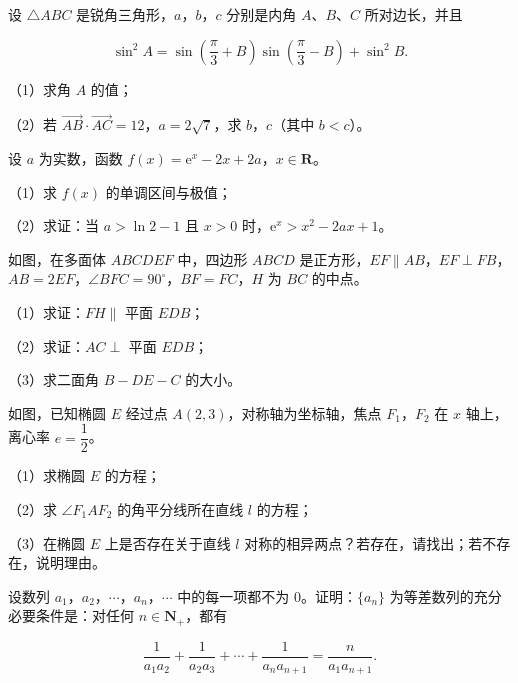 \begin{question}
设 $\triangle ABC$ 是锐角三角形，$a$，$b$，$c$ 分别是内角 $A$、$B$、$C$ 所对边长，并且

\nopagebreak[4]
\[\sin^2A=\sin\left(\frac\pi3+B\right)\sin\left(\frac\pi3-B\right)+\sin^2B.\]

（1）求角 $A$ 的值；

（2）若 $\overrightarrow{AB}\cdot\overrightarrow{AC}=12$，$a=2\sqrt7$，求 $b$，$c$（其中 $b<c$）。

\end{question}
\begin{question}
设 $a$ 为实数，函数 $f(x)=\mathrm e^x-2x+2a$，$x\in\mathbf R$。

（1）求 $f(x)$ 的单调区间与极值；

（2）求证：当 $a>\ln2-1$ 且 $x>0$ 时，$\mathrm e^x>x^2-2ax+1$。

\Needspace{0.4\textheight}
\end{question}
\begingroup
\renewenvironment{question}{\Needspace{0.5\textheight}}{}
\begin{question}
如图，在多面体 $ABCDEF$ 中，四边形 $ABCD$ 是正方形，$EF\parallel AB$，$EF\perp FB$，$AB=2EF$，$\angle BFC=90^\circ$，$BF=FC$，$H$ 为 $BC$ 的中点。

（1）求证：$FH\parallel$ 平面 $EDB$；

（2）求证：$AC\perp$ 平面 $EDB$；

（3）求二面角 $B-DE-C$ 的大小。
\nopagebreak[4]
\begin{center}\end{center}
\nopagebreak[4]
\Needspace{0.4\textheight}
\end{question}
\endgroup
\begingroup
\renewenvironment{question}{\Needspace{0.5\textheight}}{}
\begin{question}
如图，已知椭圆 $E$ 经过点 $A(2,3)$，对称轴为坐标轴，焦点 $F_1$，$F_2$ 在 $x$ 轴上，离心率 $e=\dfrac12$。

（1）求椭圆 $E$ 的方程；

（2）求 $\angle F_1AF_2$ 的角平分线所在直线 $l$ 的方程；

（3）在椭圆 $E$ 上是否存在关于直线 $l$ 对称的相异两点？若存在，请找出；若不存在，说明理由。
\nopagebreak[4]
\begin{center}\end{center}
\nopagebreak[4]
\end{question}
\endgroup
\begin{question}
设数列 $a_1$，$a_2$，$\cdots$，$a_n$，$\cdots$ 中的每一项都不为 $0$。证明：$\{a_n\}$ 为等差数列的充分必要条件是：对任何 $n\in\mathbf N_+$，都有

\nopagebreak[4]
\[\frac1{a_1a_2}+\frac1{a_2a_3}+\cdots+\frac1{a_na_{n+1}}=\frac{n}{a_1a_{n+1}}.\]

\end{question}
